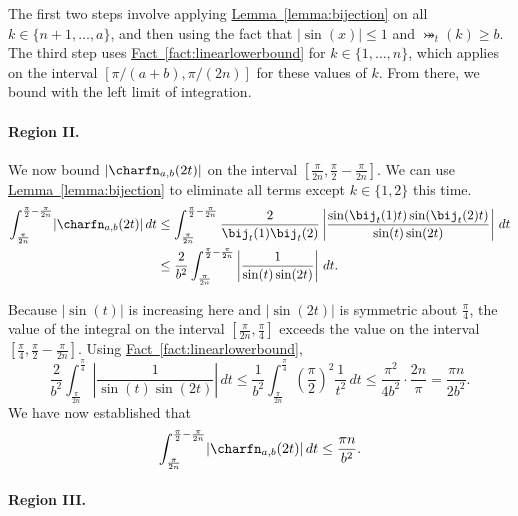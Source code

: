 \documentclass[11pt]{article}
\numberwithin{equation}{section}
\theoremstyle{definition}
\theoremstyle{plain}
\newcommand{\expref}[2]{\hyperref[#2]{#1~\ref{#2}}}
\begin{document}
The first two steps involve applying \expref{Lemma}{lemma:bijection} on all $k \in \{n+1,\dots,a\}$, and then using the fact that $\lvert\sin(x)\rvert\le 1$ and $\bij_t(k)\ge b$. The third step uses \expref{Fact}{fact:linearlowerbound} for $k \in \{1,\dots,n\}$, which applies on the interval $[\pi/(a+b),\pi/(2n)]$ for these values of $k$. From there, we bound with the left limit of integration.

\paragraph{Region II.}

We now bound $\lvert\charfn_{a,b}(2t)\rvert$ on the interval $[\frac{\pi}{2n},\frac{\pi}{2}-\frac{\pi}{2n}]$. We can use \expref{Lemma}{lemma:bijection} to eliminate all terms except $k \in \{1,2\}$ this time.
\begin{align*}
    \int_{\frac{\pi}{2n}}^{\frac{\pi}{2}-\frac{\pi}{2n}} \lvert\charfn_{a,b}(2t)\rvert\,dt &\le \int_{\frac{\pi}{2n}}^{\frac{\pi}{2}-\frac{\pi}{2n}} \frac{2}{\bij_t(1)\bij_t(2)} \left\lvert\frac{\sin(\bij_t(1)t)\sin(\bij_t(2)t)}{\sin(t)\sin(2t)} \right\rvert\,dt\\
    &\le \frac{2}{b^2}\int_{\frac{\pi}{2n}}^{\frac{\pi}{2}-\frac{\pi}{2n}} \left\lvert\frac{1}{\sin(t)\sin(2t)} \right\rvert\,dt.
\end{align*}

Because $\lvert\sin(t)\rvert$ is increasing here and $\lvert\sin(2t)\rvert$ is symmetric about $\frac{\pi}{4}$, the value of the integral on the interval $[\frac{\pi}{2n},\frac{\pi}{4}]$ exceeds the value on the interval $[\frac{\pi}{4},\frac{\pi}{2}-\frac{\pi}{2n}]$. Using \expref{Fact}{fact:linearlowerbound},
\[\frac{2}{b^2}\int_{\frac{\pi}{2n}}^{\frac{\pi}{4}} \left\lvert\frac{1}{\sin(t)\sin(2t)} \right\rvert\,dt
\le \frac{1}{b^2}\int_{\frac{\pi}{2n}}^{\frac{\pi}{4}} \left(\frac{\pi}{2}\right)^2 \frac{1}{t^2}\,dt
\le  \frac{\pi^2}{4b^2}\cdot \frac{2n}{\pi}
=\frac{\pi n}{2b^2}.\]
We have now established that
\[\int_{\frac{\pi}{2n}}^{\frac{\pi}{2}-\frac{\pi}{2n}} \lvert\charfn_{a,b}(2t)\rvert\,dt \le \frac{\pi n}{b^2}.\]

\paragraph{Region III.}
\end{document}
